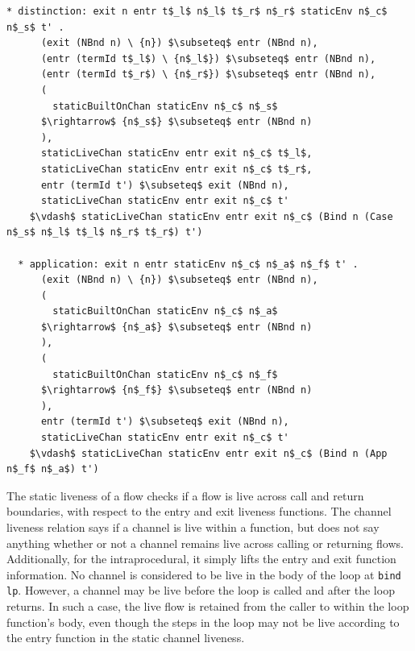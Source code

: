 \documentclass[letterpaper, 11pt]{extarticle}
\begin{document}
\begin{lstlisting}[language=logic, mathescape]
  * distinction: exit n entr t$_l$ n$_l$ t$_r$ n$_r$ staticEnv n$_c$ n$_s$ t' .
      (exit (NBnd n) \ {n}) $\subseteq$ entr (NBnd n),
      (entr (termId t$_l$) \ {n$_l$}) $\subseteq$ entr (NBnd n),
      (entr (termId t$_r$) \ {n$_r$}) $\subseteq$ entr (NBnd n),
      (
        staticBuiltOnChan staticEnv n$_c$ n$_s$
      $\rightarrow$ {n$_s$} $\subseteq$ entr (NBnd n)
      ),
      staticLiveChan staticEnv entr exit n$_c$ t$_l$,
      staticLiveChan staticEnv entr exit n$_c$ t$_r$,
      entr (termId t') $\subseteq$ exit (NBnd n),
      staticLiveChan staticEnv entr exit n$_c$ t'
    $\vdash$ staticLiveChan staticEnv entr exit n$_c$ (Bind n (Case n$_s$ n$_l$ t$_l$ n$_r$ t$_r$) t')

  * application: exit n entr staticEnv n$_c$ n$_a$ n$_f$ t' .
      (exit (NBnd n) \ {n}) $\subseteq$ entr (NBnd n),
      (
        staticBuiltOnChan staticEnv n$_c$ n$_a$
      $\rightarrow$ {n$_a$} $\subseteq$ entr (NBnd n)
      ),
      (
        staticBuiltOnChan staticEnv n$_c$ n$_f$
      $\rightarrow$ {n$_f$} $\subseteq$ entr (NBnd n)
      ),
      entr (termId t') $\subseteq$ exit (NBnd n),
      staticLiveChan staticEnv entr exit n$_c$ t'
    $\vdash$ staticLiveChan staticEnv entr exit n$_c$ (Bind n (App n$_f$ n$_a$) t')
\end{lstlisting}

The static liveness of a flow checks if a flow is live across call and return boundaries,
with respect to the entry and exit liveness functions. 
The channel liveness relation says if a channel is live within a function, but
does not say anything whether or not a channel remains live across calling or returning flows.
Additionally, for the intraprocedural, it simply lifts the entry and exit function information.
No channel is considered to be live in the body of the loop at \lstinline[language=normal_lang]{bind lp}.
However, a channel may be live before the loop is called and after the loop returns. 
In such a case, the live flow is retained from the caller to within the loop function's body, 
even though the steps in the loop may not be live according to the entry function in the static channel liveness.
\end{document}
